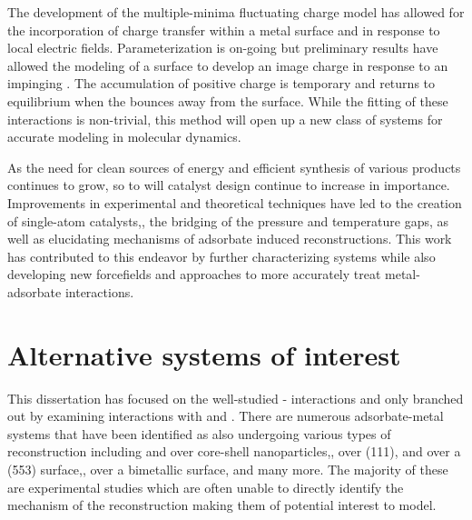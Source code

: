 %
The development of the multiple-minima fluctuating charge model has allowed for
the incorporation of charge transfer within a metal surface and in response to
local electric fields. Parameterization is on-going but preliminary results
have allowed the modeling of a  surface to develop an image charge in
response to an impinging . The accumulation of positive charge is
temporary and returns to equilibrium when the  bounces away from the
surface. While the fitting of these interactions is non-trivial, this method
will open up a new class of systems for accurate modeling in molecular
dynamics.

As the need for clean sources of energy and efficient synthesis of various
products continues to grow, so to will catalyst design continue to increase in
importance.  Improvements in experimental and theoretical techniques have led
to the creation of single-atom catalysts,\citep{Qiao:2011zp, Yang:2013sf}, the
bridging of the pressure and temperature gaps,\citep{Tao:2010aa, Eren:2016qt}
as well as elucidating mechanisms of adsorbate induced
reconstructions. \citep{Michalka:2013aa,Kim:2016cr} This work has contributed to
this endeavor by further characterizing  systems while also
developing new forcefields and approaches to more accurately treat
metal-adsorbate interactions.



\section{Alternative systems of interest}
This dissertation has focused on the well-studied - interactions
and only branched out by examining  interactions with  and
.  There are numerous adsorbate-metal systems that have been identified
as also undergoing various types of reconstruction including  and
 over  core-shell nanoparticles,\citep{Tao:2008aa},
 over  (111),\citep{Eren:2016qt}  and  over a (553)
 surface,\citep{Zhang:2015zr},  over a  bimetallic
surface,\citep{Kim:2013mi} and many more. The majority of these are experimental
studies which are often unable to directly identify the mechanism of the
reconstruction making them of potential interest to model.

